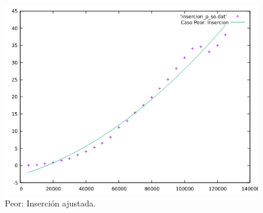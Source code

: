 \documentclass[a4paper,12pt,twoside]{article} %
\begin{document}
\begin{itemize}
\begin{figure}[h]
\begin{center}
  	\includegraphics[scale=0.8]{insercion_p_so_a.png}
  	\caption{Peor: Inserción ajustada.}
  	
  \end{center}
\end{figure}
		
	\end{itemize}
	\newpage
\end{document}

